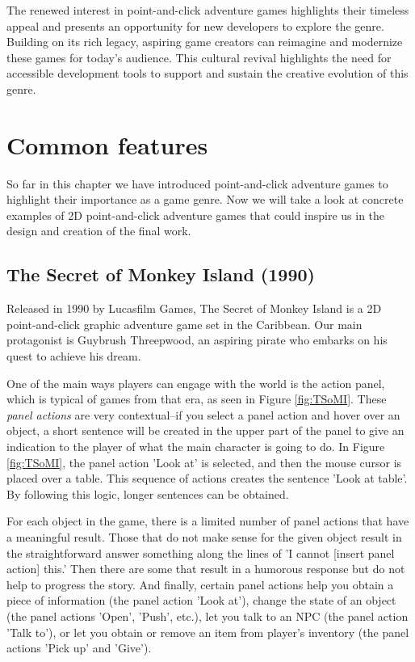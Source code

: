 The renewed interest in point-and-click adventure games highlights their timeless appeal and presents an opportunity for new developers to explore the genre. Building on its rich legacy, aspiring game creators can reimagine and modernize these games for today's audience. This cultural revival highlights the need for accessible development tools to support and sustain the creative evolution of this genre.

\section{Common features}
So far in this chapter we have introduced point-and-click adventure games to highlight their importance as a game genre. Now we will take a look at concrete examples of 2D point-and-click adventure games that could inspire us in the design and creation of the final work.

\subsection{The Secret of Monkey Island (1990)}
Released in 1990 by Lucasfilm Games, The Secret of Monkey Island is a 2D point-and-click graphic adventure game set in the Caribbean. Our main protagonist is Guybrush Threepwood, an aspiring pirate who embarks on his quest to achieve his dream.

One of the main ways players can engage with the world is the action panel, which is typical of games from that era, as seen in Figure \ref{fig:TSoMI}. These \textit{panel actions} are very contextual--if you select a panel action and hover over an object, a short sentence will be created in the upper part of the panel to give an indication to the player of what the main character is going to do. In Figure \ref{fig:TSoMI}, the panel action 'Look at' is selected, and then the mouse cursor is placed over a table. This sequence of actions creates the sentence 'Look at table'. By following this logic, longer sentences can be obtained.

For each object in the game, there is a limited number of panel actions that have a meaningful result. Those that do not make sense for the given object result in the straightforward answer something along the lines of 'I cannot [insert panel action] this.' Then there are some that result in a humorous response but do not help to progress the story. And finally, certain panel actions help you obtain a piece of information (the panel action 'Look at'), change the state of an object (the panel actions 'Open', 'Push', etc.), let you talk to an NPC (the panel action 'Talk to'), or let you obtain or remove an item from player's inventory (the panel actions 'Pick up' and 'Give').


